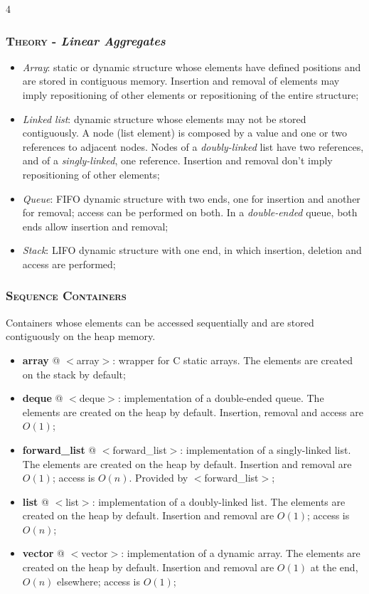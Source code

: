 \documentclass[10pt]{article}
\begin{document}
\begin{multicols*}{4}
{\subsubsection*{\textsc{Theory} - \emph{Linear Aggregates}} 

\begin{itemize}[leftmargin=*,topsep=0.25pt]
  \setlength\itemsep{-1.8pt}
	\item \emph{Array}: static or dynamic structure whose elements have defined positions and are stored in contiguous memory. Insertion and removal of elements may imply repositioning of other elements or repositioning of the entire structure; 
	\item \emph{Linked list}: dynamic structure whose elements may not be stored contiguously. A node (list element) is composed by a value and one or two references to adjacent nodes. Nodes of a \emph{doubly-linked} list have two references, and of a \emph{singly-linked}, one reference. Insertion and removal don't imply repositioning of other elements;
	\item \emph{Queue}: FIFO dynamic structure with two ends, one for insertion and another for removal; access can be performed on both. In a \emph{double-ended} queue, both ends allow insertion and removal;  
	\item \emph{Stack}: LIFO dynamic structure with one end, in which insertion, deletion and access are performed;
\end{itemize}

\subsubsection*{\textsc{Sequence Containers}} 
\noindent
Containers whose elements can be accessed sequentially and are stored contiguously on the heap memory.

\begin{itemize}[leftmargin=*,topsep=0.25pt]
  \setlength\itemsep{-1.8pt}
	\item \textbf{array} @ $<$array$>$: wrapper for C static arrays. The elements are created on the stack by default;
	\item \textbf{deque} @ $<$deque$>$: implementation of a double-ended queue. The elements are created on the heap by default. Insertion, removal and access are $O(1)$;
	\item \textbf{forward\_list} @ $<$forward\_list$>$: implementation of a singly-linked list. The elements are created on the heap by default. Insertion and removal are $O(1)$; access is $O(n)$. Provided by $<$forward\_list$>$;  
	\item \textbf{list} @ $<$list$>$: implementation of a doubly-linked list. The elements are created on the heap by default. Insertion and removal are $O(1)$; access is $O(n)$;
	\item \textbf{vector} @ $<$vector$>$: implementation of a dynamic array. The elements are created on the heap by default. Insertion and removal are $O(1)$ at the end, $O(n)$ elsewhere; access is $O(1)$;
\end{itemize}

}
\end{multicols*}
\end{document}

